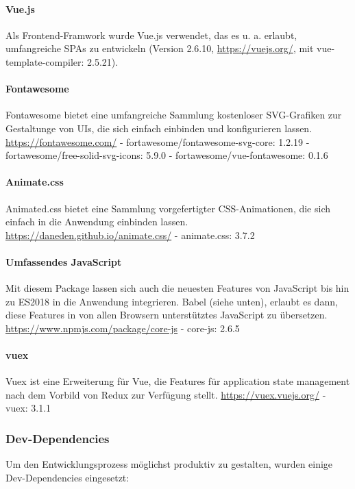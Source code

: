 	\paragraph{Vue.js}
	Als Frontend-Framwork wurde Vue.js verwendet, das es u. a. erlaubt, umfangreiche SPAs zu entwickeln (Version 2.6.10, \url{https://vuejs.org/}, mit vue-template-compiler: 2.5.21).
	
	\paragraph{Fontawesome}
Fontawesome bietet eine umfangreiche Sammlung kostenloser SVG-Grafiken zur Gestaltunge von UIs, die sich einfach einbinden und konfigurieren lassen. \url{https://fontawesome.com/}
- fortawesome/fontawesome-svg-core: 1.2.19
- fortawesome/free-solid-svg-icons: 5.9.0
- fortawesome/vue-fontawesome: 0.1.6

	\paragraph{Animate.css}
Animated.css bietet eine Sammlung vorgefertigter CSS-Animationen, die sich einfach in die Anwendung einbinden lassen. \url{https://daneden.github.io/animate.css/}
- animate.css: 3.7.2

	\paragraph{Umfassendes JavaScript}
Mit diesem Package lassen sich auch die neuesten Features von JavaScript bis hin zu ES2018 in die Anwendung integrieren. Babel (siehe unten), erlaubt es dann, diese Features in von allen Browsern unterstütztes JavaScript zu übersetzen. \url{https://www.npmjs.com/package/core-js}
- core-js: 2.6.5

	\paragraph{vuex}
Vuex ist eine Erweiterung für Vue, die Features für application state management nach dem Vorbild von Redux zur Verfügung stellt. \url{https://vuex.vuejs.org/}
- vuex: 3.1.1

\subsubsection{Dev-Dependencies}
Um den Entwicklungsprozess möglichst produktiv zu gestalten, wurden einige Dev-Dependencies eingesetzt:

